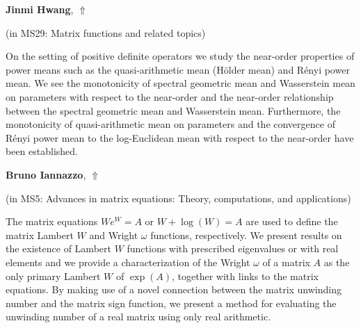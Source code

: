 \documentclass[ILAS2025-program.tex]{subfiles}
\begin{document}
\hypertarget{down0015}{}\begin{ilasabstract}
    
\textbf{Jinmi Hwang},  \hfill \hyperlink{up0015}{$\Uparrow$}
    
    
(in {\color{mstitle}MS29: Matrix functions and related topics})
        
\mtskip
    On the setting of positive definite operators we study the near-order properties of power means such as the quasi-arithmetic mean (H\"{o}lder mean) and R\'{e}nyi power mean. We see the monotonicity of spectral geometric mean and Wasserstein mean on parameters with respect to the near-order and the near-order relationship between the spectral geometric mean and Wasserstein mean. Furthermore, the monotonicity of quasi-arithmetic mean on parameters and the convergence of R\'{e}nyi power mean to the log-Euclidean mean with respect to the near-order have been established.
\end{ilasabstract}
    

\hypertarget{down0065}{}\begin{ilasabstract}
    
\textbf{Bruno Iannazzo},  \hfill \hyperlink{up0065}{$\Uparrow$}
    
    
(in {\color{mstitle}MS5: Advances in matrix equations: Theory, computations, and applications})
        
\mtskip
    The matrix equations $We^W=A$ or $W+\log(W)=A$ are used to define the matrix Lambert $W$ and Wright $\omega$ functions, respectively. We present results on the existence of Lambert $W$ functions with prescribed eigenvalues or with real elements and we provide a characterization of the Wright $\omega$ of a matrix $A$ as the only primary Lambert $W$ of $\exp(A)$, together with links to the matrix equations. By making use of a novel connection between the matrix unwinding number and the matrix sign function, we present a method for evaluating the unwinding number of a real matrix using only real arithmetic.

\end{ilasabstract}
    
\end{document}
